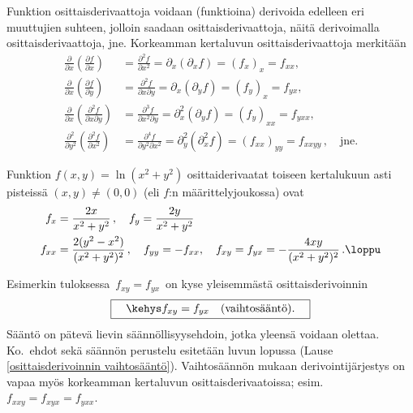 Funktion osittaisderivaattoja voidaan (funktioina) derivoida edelleen eri muuttujien suhteen,
jolloin saadaan
%
 osittaisderivaattoja, näitä derivoimalla
 osittaisderivaattoja, jne. Korkeamman kertaluvun
osittaisderivaattoja merkitään
\begin{align*}
\frac{\partial}{\partial x}\left(\frac{\partial f}{\partial x}\right) 
       &= \frac{\partial^2 f}{\partial x^2}
        =\partial_x(\partial_x f)=(f_x)_x =f_{xx}, \\[1mm]
\frac{\partial}{\partial x}\left(\frac{\partial f}{\partial y}\right) 
       &= \frac{\partial^2 f}{\partial x\partial y}
        =\partial_x(\partial_y f)=(f_y)_x =f_{yx}, \\[1mm]
\frac{\partial}{\partial x}\left(\frac{\partial^2 f}{\partial x\partial y}\right) 
       &= \frac{\partial^3 f}{\partial x^2\partial y}
        =\partial_x^2(\partial_y f)=(f_y)_{xx}=f_{yxx}, \\[1mm]
\frac{\partial^2}{\partial y^2}\left(\frac{\partial^2 f}{\partial x^2}\right) 
       &= \frac{\partial^4 f}{\partial y^2\partial x^2}
        =\partial_y^2(\partial_x^2 f)=(f_{xx})_{yy}=f_{xxyy}\,, \quad \text{jne.}
\end{align*}
\begin{Exa} \label{osder-esim 2} Funktion $f(x,y)=\ln (x^2+y^2)$ osittaiderivaatat toiseen
kertalukuun asti pisteissä $(x,y)\neq(0,0)$ (eli $f$:n määrittelyjoukossa) ovat
\begin{align*}
f_x    &= \frac{2x}{x^2+y^2}\,,\quad f_y=\frac{2y}{x^2+y^2}\, \\
f_{xx} &= \frac{2(y^2-x^2)}{(x^2+y^2)^2}\,,\quad f_{yy} = -f_{xx}, \quad
          f_{xy} = f_{yx}=-\frac{4xy}{(x^2+y^2)^2}\,. \loppu
\end{align*}
\end{Exa}
Esimerkin tuloksessa $\,f_{xy}=f_{yx}\,$ on kyse yleisemmästä osittaisderivoinnin
 
%
\begin{equation} \label{vaihtosääntö}
\boxed{\quad\kehys f_{xy}=f_{yx} \quad \text{(vaihtosääntö)}.\quad}
\end{equation}
Sääntö on pätevä lievin säännöllisyysehdoin, jotka yleensä voidaan olettaa. Ko.\ ehdot sekä
säännön perustelu esitetään luvun lopussa (Lause \ref{osittaisderivoinnin vaihtosääntö}).
Vaihtosäännön mukaan derivointijärjestys on vapaa myös korkeamman kertaluvun
osittaisderivaatoissa; esim.\ $f_{xxy}=f_{xyx}=f_{yxx}$.

